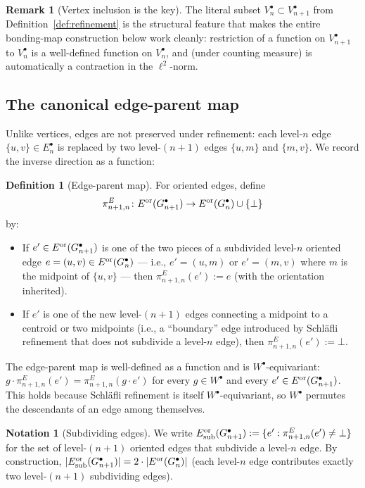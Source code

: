 \documentclass[11pt, a4paper]{amsart}
\theoremstyle{definition}
\newtheorem{definition}[theorem]{Definition}
\newtheorem{remark}[theorem]{Remark}
\newtheorem{notation}[theorem]{Notation}
\begin{document}
\begin{remark}[Vertex inclusion is the key]
\label{rmk:vertex-inclusion}
The literal subset $V_n^\bullet \subset V_{n+1}^\bullet$ from
Definition~\ref{def:refinement} is the structural feature that
makes the entire bonding-map construction below work cleanly:
restriction of a function on $V_{n+1}^\bullet$ to $V_n^\bullet$ is
a well-defined function on $V_n^\bullet$, and (under counting
measure) is automatically a contraction in the $\ell^2$-norm.
\end{remark}

\subsection{The canonical edge-parent map}

Unlike vertices, edges are not preserved under refinement: each
level-$n$ edge $\{u, v\} \in E_n^\bullet$ is replaced by two
level-$(n+1)$ edges $\{u, m\}$ and $\{m, v\}$. We record the
inverse direction as a function:

\begin{definition}[Edge-parent map]
\label{def:edge-parent}
For oriented edges, define
\[
  \pi_{n+1, n}^E \colon E^{\rm or}(G_{n+1}^\bullet) \to
    E^{\rm or}(G_n^\bullet) \cup \{\bot\}
\]
by:
\begin{itemize}
\item If $e' \in E^{\rm or}(G_{n+1}^\bullet)$ is one of the two
  pieces of a subdivided level-$n$ oriented edge $e =
  (u, v) \in E^{\rm or}(G_n^\bullet)$ --- i.e., $e' = (u, m)$ or
  $e' = (m, v)$ where $m$ is the midpoint of $\{u, v\}$ ---
  then $\pi_{n+1, n}^E(e') := e$ (with the orientation inherited).
\item If $e'$ is one of the new level-$(n+1)$ edges connecting a
  midpoint to a centroid or two midpoints (i.e., a ``boundary''
  edge introduced by Schl\"{a}fli refinement that does not
  subdivide a level-$n$ edge), then $\pi_{n+1, n}^E(e') := \bot$.
\end{itemize}
The edge-parent map is well-defined as a function and is
$W^\bullet$-equivariant: $g \cdot \pi_{n+1, n}^E(e') = \pi_{n+1, n}^
E(g \cdot e')$ for every $g \in W^\bullet$ and every $e' \in
E^{\rm or}(G_{n+1}^\bullet)$. This holds because Schl\"{a}fli
refinement is itself $W^\bullet$-equivariant, so $W^\bullet$ permutes
the descendants of an edge among themselves.
\end{definition}

\begin{notation}[Subdividing edges]
\label{not:subdividing}
We write $E^{\rm or}_{\rm sub}(G_{n+1}^\bullet) := \{e' :
\pi_{n+1, n}^E(e') \neq \bot\}$ for the set of level-$(n+1)$
oriented edges that subdivide a level-$n$ edge. By construction,
$|E^{\rm or}_{\rm sub}(G_{n+1}^\bullet)| = 2 \cdot |E^{\rm or}(G_n^
\bullet)|$ (each level-$n$ edge contributes exactly two
level-$(n+1)$ subdividing edges).
\end{notation}
\end{document}
